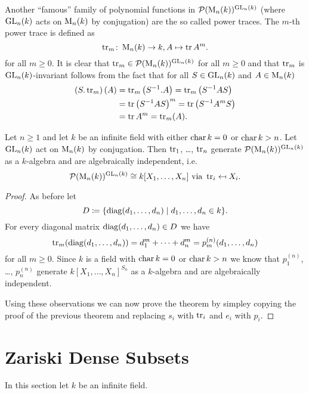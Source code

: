 Another ``famous'' family of polynomial functions in $\mathcal{P}(\operatorname{M}_n(k))^{\operatorname{GL}_n(k)}$ (where $\operatorname{GL}_n(k)$ acts on $\operatorname{M}_n(k)$ by conjugation) are the so called power traces.
The $m$-th power trace is defined as
\[
          \operatorname{tr}_m
  \colon  \operatorname{M}_n(k)
  \to     k,
          A
  \mapsto \operatorname{tr} A^m.
\]
for all $m \geq 0$.
It is clear that $\operatorname{tr}_m \in \mathcal{P}(\operatorname{M}_n(k))^{\operatorname{GL}_n(k)}$ for all $m \geq 0$ and that $\operatorname{tr}_m$ is $\operatorname{GL}_n(k)$-invariant follows from the fact that for all $S \in \operatorname{GL}_n(k)$ and $A \in \operatorname{M}_n(k)$
\begin{align*}
      \left( S.\operatorname{tr}_m \right)(A)
  &=  \operatorname{tr}_m\left( S^{-1}.A \right)
   =  \operatorname{tr}_m\left( S^{-1} A S \right)  \\
  &=  \operatorname{tr} \left( S^{-1} A S \right)^m
   =  \operatorname{tr} \left( S^{-1} A^m S \right) \\
  &=  \operatorname{tr} A^m
   =  \operatorname{tr}_m(A).
\end{align*}


\begin{thrm}
  Let $n \geq 1$ and let $k$ be an infinite field with either $\operatorname{char} k = 0$ or $\operatorname{char} k > n$.
  Let $\operatorname{GL}_n(k)$ act on $\operatorname{M}_n(k)$ by conjugation.
  Then $\operatorname{tr}_1$, \dots, $\operatorname{tr}_n$ generate $\mathcal{P}(\operatorname{M}_n(k))^{\operatorname{GL}_n(k)}$ as a $k$-algebra and are algebraically independent, i.e.\
  \[
          \mathcal{P}(\operatorname{M}_n(k))^{\operatorname{GL}_n(k)}
    \cong k[X_1, \dotsc, X_n]
    \text{ via }
              \operatorname{tr}_i
    \mapsfrom X_i.
  \]
\end{thrm}
\begin{proof}
  As before let 
  \[
              D
    \coloneqq \{
                \operatorname{diag}(d_1, \dotsc, d_n)
              \mid
                    d_1, \dotsc, d_n
                \in k
              \}.
  \]
  For every diagonal matrix $\operatorname{diag}(d_1, \dotsc, d_n) \in D$ we have
  \[
      \operatorname{tr}_m( \operatorname{diag}(d_1, \dotsc, d_n) )
    = d_1^m + \dotsb + d_n^m
    = p^{(n)}_m(d_1, \dotsc, d_n)
  \]
  for all $m \geq 0$.
  Since $k$ is a field with $\operatorname{char} k = 0$ or $\operatorname{char} k > n$ we know that $p^{(n)}_1$, \dots, $p^{(n)}_n$ generate $k[X_1, \dotsc, X_n]^{S_n}$ as a $k$-algebra and are algebraically independent.
  
  Using these observations we can now prove the theorem by simpley copying the proof of the previous theorem and replacing $s_i$ with $\operatorname{tr}_i$ and $e_i$ with $p_i$.
\end{proof}





\section{Zariski Dense Subsets}
In this section let $k$ be an infinite field.



